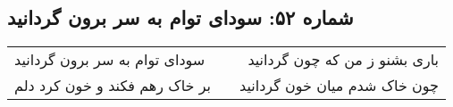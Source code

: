 \begin{center}
\section*{شماره ۵۲: سودای توام به سر برون گردانید}
\label{sec:052}
\begin{longtable}{l p{0.5cm} r}
سودای توام به سر برون گردانید
&&
باری بشنو ز من که چون گردانید
\\
بر خاک رهم فکند و خون کرد دلم
&&
چون خاک شدم میان خون گردانید
\\
\end{longtable}
\end{center}
